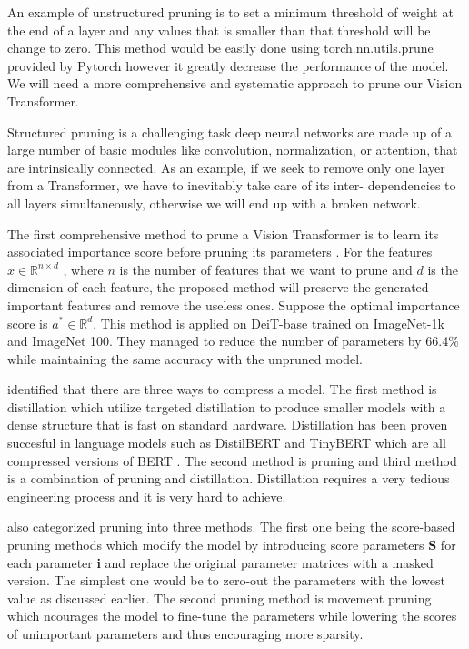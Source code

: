 An example of unstructured pruning is to set a minimum threshold of weight at the end of a layer and any values that is smaller than that threshold will be change to zero. This method would be easily done using torch.nn.utils.prune provided by Pytorch however it greatly decrease the performance of the model. We will need a more comprehensive and systematic approach to prune our Vision Transformer.

Structured pruning is a challenging task deep neural networks are made up of a large number of basic modules like convolution, normalization, or attention, that are intrinsically connected. As an example, if we seek to remove only one layer from a Transformer, we have to inevitably take care of its inter-
dependencies to all layers simultaneously, otherwise we will end up with a broken network.

The first comprehensive method to prune a Vision Transformer is to learn its associated importance score before pruning its parameters \cite{pruning-vit}. For the features $x \in \mathbb{R}^{n \times d}$ , where $n$ is the number of features that we want to prune and $d$ is the dimension of each feature, the proposed method will preserve the generated important features and remove the useless ones. Suppose the optimal importance score is $a^* \in \mathbb{R}^d$. This method is applied on DeiT-base \cite{deit} trained on ImageNet-1k and ImageNet 100. They managed to reduce the number of parameters by 66.4\% while maintaining the same accuracy with the unpruned model.

 identified that there are three ways to compress a model. The first method is distillation which utilize targeted distillation to produce smaller models with a dense structure that is fast on standard hardware. Distillation has been proven succesful in language models such as DistilBERT \cite{distilbert} and TinyBERT \cite{tinybert} which are all compressed versions of BERT \cite{bert}. The second method is pruning and third method is a combination of pruning and distillation. Distillation requires a very tedious engineering process and it is very hard to achieve.

 also categorized pruning into three methods. The first one being the score-based pruning methods \cite{score-pruning} which modify the model by introducing score parameters \textbf{S} for each parameter \textbf{i} and replace the original parameter matrices with a masked version. The simplest one would be to zero-out the parameters with the lowest value as discussed earlier. The second pruning method is movement pruning which ncourages the model to fine-tune the parameters while lowering the scores of unimportant parameters and thus encouraging more sparsity. 


